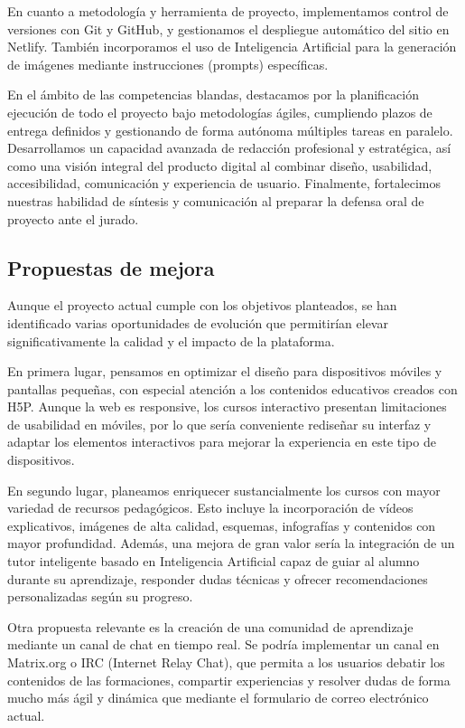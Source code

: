 \documentclass[11.5pt]{article}
\begin{document}
	En cuanto a metodología y herramienta de proyecto, implementamos control de versiones con Git y GitHub, y gestionamos el despliegue automático del sitio en Netlify. También incorporamos el uso de Inteligencia Artificial para la generación de imágenes mediante instrucciones (prompts) específicas. 
	
	En el ámbito de las competencias blandas, destacamos por la planificación ejecución de todo el proyecto bajo metodologías ágiles, cumpliendo plazos de entrega definidos y gestionando de forma autónoma múltiples tareas en paralelo. Desarrollamos un capacidad avanzada de redacción profesional y estratégica, así como una visión integral del producto digital al combinar diseño, usabilidad, accesibilidad, comunicación y experiencia de usuario. Finalmente, fortalecimos nuestras habilidad de síntesis y comunicación al preparar la defensa oral de proyecto ante el jurado.
	
	\subsection{Propuestas de mejora}
	
	Aunque el proyecto actual cumple con los objetivos planteados, se han identificado varias oportunidades de evolución que permitirían elevar significativamente la calidad y el impacto de la plataforma.
	
	En primera lugar, pensamos en optimizar el diseño para dispositivos móviles y pantallas pequeñas, con especial atención a los contenidos educativos creados con H5P. Aunque la web es responsive, los cursos interactivo presentan limitaciones de usabilidad en móviles, por lo que sería conveniente rediseñar su interfaz y adaptar los elementos interactivos para mejorar la experiencia en este tipo de dispositivos.
	
	En segundo lugar, planeamos enriquecer sustancialmente los cursos con mayor variedad de recursos pedagógicos. Esto incluye la incorporación de vídeos explicativos, imágenes de alta calidad, esquemas, infografías y contenidos con mayor profundidad. Además, una mejora de gran valor sería la integración de un tutor inteligente basado en Inteligencia Artificial capaz de guiar al alumno durante su aprendizaje, responder dudas técnicas y ofrecer recomendaciones personalizadas según su progreso.
	
	Otra propuesta relevante es la creación de una comunidad de aprendizaje mediante un canal de chat en tiempo real. Se podría implementar un canal en Matrix.org o IRC (Internet Relay Chat), que permita a los usuarios debatir los contenidos de las formaciones, compartir experiencias y resolver dudas de forma mucho más ágil y dinámica que mediante el formulario de correo electrónico actual.
	
\end{document}
